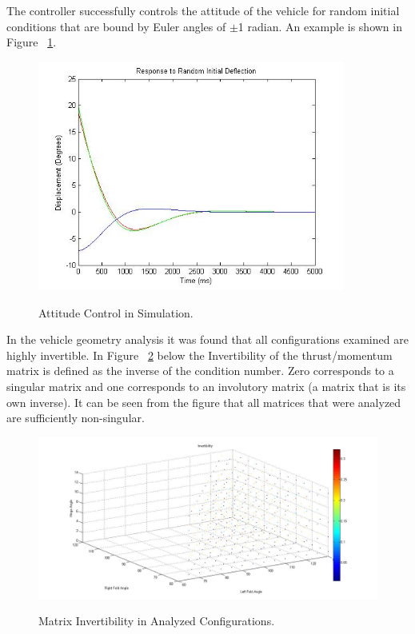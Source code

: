 \documentclass[]{aiaa-tc}%
\begin{document}
The controller successfully controls the attitude of the vehicle for random initial conditions that are bound by Euler angles of $\pm $1 radian. An example is shown in Figure ~\ref{fig:Response}.
\begin{figure}[H]
\caption{Attitude Control in Simulation.}
\center
\includegraphics[width=0.9\textwidth]{Response}
\label{fig:Response}
\end{figure}
In the vehicle geometry analysis it was found that all configurations examined are highly invertible. In Figure ~\ref{fig:Invertibility} below the Invertibility of the thrust/momentum matrix is defined as the inverse of the condition number. Zero corresponds to a singular matrix and one corresponds to an involutory matrix (a matrix that is its own inverse). It can be seen from the figure that all matrices that were analyzed are sufficiently non-singular.
\begin{figure}[H]
\caption{Matrix Invertibility in Analyzed Configurations.}
\center
\includegraphics[width=1\textwidth]{Invertibility}
\label{fig:Invertibility}
\end{figure}
\end{document}
